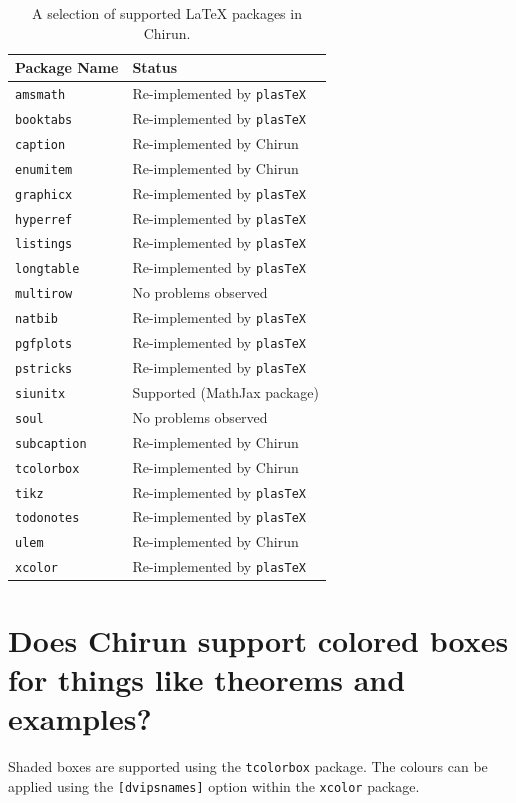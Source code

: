 \documentclass{article} %
\begin{document}
\begin{table}[h]
    \centering
    \begin{tabular}{l l}
        \toprule
        \textbf{Package Name} & \textbf{Status} \\
        \midrule
        \texttt{amsmath} & Re-implemented by \texttt{plasTeX} \\
        \texttt{booktabs} & Re-implemented by \texttt{plasTeX} \\
        \texttt{caption} & Re-implemented by Chirun \\
        \texttt{enumitem} & Re-implemented by Chirun \\
        \texttt{graphicx} & Re-implemented by \texttt{plasTeX} \\
        \texttt{hyperref} & Re-implemented by \texttt{plasTeX} \\
        \texttt{listings} & Re-implemented by \texttt{plasTeX} \\
        \texttt{longtable} & Re-implemented by \texttt{plasTeX} \\
        \texttt{multirow} & No problems observed \\
        \texttt{natbib} & Re-implemented by \texttt{plasTeX} \\
        \texttt{pgfplots} & Re-implemented by \texttt{plasTeX} \\
        \texttt{pstricks} & Re-implemented by \texttt{plasTeX} \\
        \texttt{siunitx} & Supported (MathJax package) \\
        \texttt{soul} & No problems observed \\
        \texttt{subcaption} & Re-implemented by Chirun \\
        \texttt{tcolorbox} & Re-implemented by Chirun \\
        \texttt{tikz} & Re-implemented by \texttt{plasTeX} \\
        \texttt{todonotes} & Re-implemented by \texttt{plasTeX} \\
        \texttt{ulem} & Re-implemented by Chirun \\
        \texttt{xcolor} & Re-implemented by \texttt{plasTeX} \\
        \bottomrule
    \end{tabular}
    \caption{A selection of supported LaTeX packages in Chirun.}
    \label{tab:chirun_packages}
\end{table}

\section{Does Chirun support colored boxes for things like theorems and examples?}
Shaded boxes are supported using the \verb|tcolorbox| package. The colours can be applied using the \verb|[dvipsnames]| option within the \verb|xcolor| package.
\end{document}
